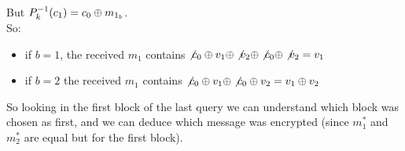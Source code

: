 \documentclass[11pt]{article}
\newcounter{t0d0_counter}
\begin{document}
\begin{figure}[h!]
   \centering
   \sdinit{}
\end{figure}
But $P_{k}^{-1}(c_{1})=c_{0} \oplus m_{1_{b}}$.\\

So:
\begin{itemize}
    \item if $b=1$, the received $m_{1}$  contains  $\not c_{0} \oplus v_{1} \oplus
        \not v_{2} \oplus \not c_{0} \oplus \not v_{2}= v_{1} $
    \item if $b=2$ the received $m_{1}$ contains $ \not c_{0} \oplus v_{1} \oplus
        \not c_{0} \oplus v_{2}= v_{1} \oplus v_{2}$
\end{itemize}
So looking in the first block of the last query we can understand which block
was chosen as first, and we can deduce which message was encrypted (since
$m_{1}^{*}$ and $m_{2}^{*}$ are equal but for the first block).
\newpage
\end{document}
